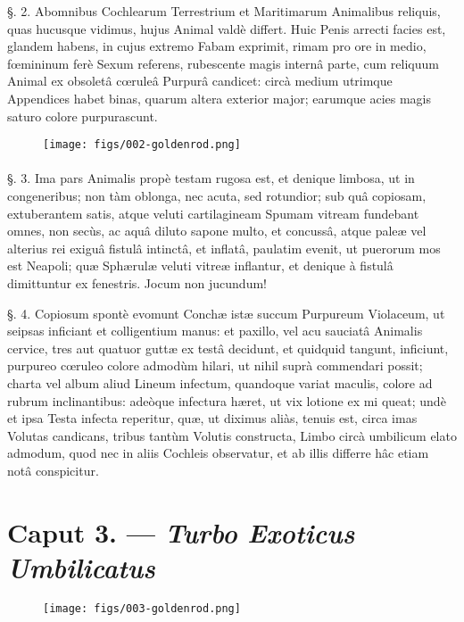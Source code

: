 \documentclass[a4paper, 11pt, oneside, polutonikogreek, german]{article}
\begin{document}
§. 2. Abomnibus Cochlearum Terrestrium et Maritimarum Animalibus reliquis, quas hucusque vidimus, hujus Animal valdè differt. Huic Penis arrecti facies est, glandem habens, in cujus extremo Fabam exprimit, rimam pro ore in medio, fœmininum ferè Sexum referens, rubescente magis internâ parte, cum reliquum Animal ex obsoletâ cœruleâ Purpurâ candicet: circà medium utrimque Appendices habet binas, quarum altera exterior major; earumque acies magis saturo colore purpurascunt.

\begin{figure}[H]
\centering
\texttt{[image: figs/002-goldenrod.png]}

\end{figure}
\paragraph{}
§. 3. Ima pars Animalis propè testam rugosa est, et denique limbosa, ut in congeneribus; non tàm oblonga, nec acuta, sed rotundior; sub quâ copiosam, extuberantem satis, atque veluti cartilagineam Spumam vitream fundebant omnes, non secùs, ac aquâ diluto sapone multo, et concussâ, atque paleæ vel alterius rei exiguâ fistulâ intinctâ, et inflatâ, paulatim evenit, ut puerorum mos est Neapoli; quæ Sphærulæ veluti vitreæ inflantur, et denique à fistulâ dimittuntur ex fenestris. Jocum non jucundum!

§. 4. Copiosum spontè evomunt Conchæ istæ succum Purpureum Violaceum, ut seipsas inficiant et colligentium manus: et paxillo, vel acu sauciatâ Animalis cervice, tres aut quatuor guttæ ex testâ decidunt, et quidquid tangunt, inficiunt, purpureo cœruleo colore admodùm hilari, ut nihil suprà commendari possit; charta vel album aliud Lineum infectum, quandoque variat maculis, colore ad rubrum inclinantibus: adeòque infectura hæret, ut vix lotione ex mi queat; undè et ipsa Testa infecta reperitur, quæ, ut diximus aliàs, tenuis est, circa imas Volutas candicans, tribus tantùm Volutis constructa, Limbo circà umbilicum elato admodum, quod nec in aliis Cochleis observatur, et ab illis differre hâc etiam notâ conspicitur.

\section{Caput 3. --- \emph{Turbo Exoticus Umbilicatus}}
\begin{figure}[H]
\centering
\texttt{[image: figs/003-goldenrod.png]}

\end{figure}
\end{document}
